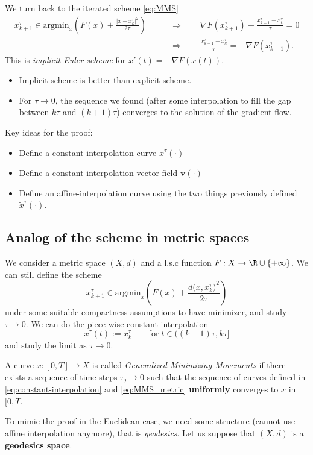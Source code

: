 We turn back to the iterated scheme \eqref{eq:MMS}
\begin{align*}
    x^\tau_{k+1} \in \mathrm{argmin}_{x}\left( F(x) + \frac{|x-x_k^\tau|^2}{2\tau}\right) &\qquad\Longrightarrow\qquad\nabla F(x^\tau_{k+1}) + \frac{x^\tau_{k+1}-x^\tau_k}{\tau} = 0\\
    &\qquad\Longrightarrow\qquad \frac{x^\tau_{k+1}-x^\tau_k}{\tau} =-\nabla F(x^\tau_{k+1}).
\end{align*}
This is \emph{implicit Euler scheme} for $x'(t) = -\nabla F(x(t))$. 
\begin{itemize}
    \item Implicit scheme is better than explicit scheme.
    \item For $\tau\to 0$, the sequence we found (after some interpolation to fill the gap between $k\tau$ and $(k+1)\tau$) converges to the solution of the gradient flow.
\end{itemize}
Key ideas for the proof:
\begin{itemize}
    \item Define a constant-interpolation curve $x^\tau(\cdot)$
    \item Define a constant-interpolation vector field $\mathbf{v}(\cdot)$ 
    \item Define an affine-interpolation curve using the two things previously defined $\tilde{x}^\tau(\cdot)$.
\end{itemize}

\subsection{Analog of the scheme in metric spaces}
We consider a metric space $(X,d)$ and a l.s.c function $F:X\to \R\cup \{+\infty\}$. We can still define the scheme 
\begin{equation}\label{eq:MMS_metric}
    x^\tau_{k+1} \in \mathrm{argmin}_{x}\left( F(x) + \frac{d\big(x,x_k^\tau\big)^2}{2\tau}\right)
\end{equation}
under some suitable compactness assumptions to have minimizer, and study $\tau\to 0$. We can do the piece-wise constant interpolation
\begin{equation}\label{eq:constant-interpolation}
    x^\tau(t) := x_k^\tau \qquad \text{for}\; t\in \big((k-1)\tau, k\tau \big]
\end{equation}
and study the limit as $\tau \to 0$. 
\begin{defn} A curve $x:[0,T]\to X$ is called \emph{Generalized Minimizing Movements} if there exists a sequence of time steps $\tau_j\to 0$ such that the sequence of curves defined in \eqref{eq:constant-interpolation} and \eqref{eq:MMS_metric} \textbf{uniformly} converges to $x$ in $[0,T$.
\end{defn}
To mimic the proof in the Euclidean case, we need some structure (cannot use affine interpolation anymore), that is \emph{geodesics}. Let us suppose that $(X,d)$ is a \textbf{geodesics space}.

